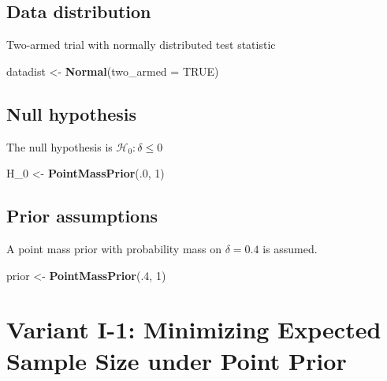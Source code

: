\documentclass[]{book}
\newenvironment{Shaded}{\begin{snugshade}}{\end{snugshade}}
\newcommand{\DataTypeTok}[1]{\textcolor[rgb]{0.13,0.29,0.53}{#1}}
\newcommand{\DecValTok}[1]{\textcolor[rgb]{0.00,0.00,0.81}{#1}}
\newcommand{\KeywordTok}[1]{\textcolor[rgb]{0.13,0.29,0.53}{\textbf{#1}}}
\newcommand{\NormalTok}[1]{#1}
\newcommand{\OtherTok}[1]{\textcolor[rgb]{0.56,0.35,0.01}{#1}}
\newcommand{\StringTok}[1]{\textcolor[rgb]{0.31,0.60,0.02}{#1}}
\begin{document}
\hypertarget{data-distribution}{%
\subsection{Data distribution}\label{data-distribution}}

Two-armed trial with normally distributed test statistic

\begin{Shaded}
\begin{Highlighting}[]
\NormalTok{datadist <-}\StringTok{ }\KeywordTok{Normal}\NormalTok{(}\DataTypeTok{two_armed =} \OtherTok{TRUE}\NormalTok{)}
\end{Highlighting}
\end{Shaded}

\hypertarget{null-hypothesis}{%
\subsection{Null hypothesis}\label{null-hypothesis}}

The null hypothesis is \(\mathcal{H}_0:\delta \leq 0\)

\begin{Shaded}
\begin{Highlighting}[]
\NormalTok{H_}\DecValTok{0}\NormalTok{ <-}\StringTok{ }\KeywordTok{PointMassPrior}\NormalTok{(.}\DecValTok{0}\NormalTok{, }\DecValTok{1}\NormalTok{)}
\end{Highlighting}
\end{Shaded}

\hypertarget{prior-assumptions}{%
\subsection{Prior assumptions}\label{prior-assumptions}}

A point mass prior with probability mass on \(\delta = 0.4\) is assumed.

\begin{Shaded}
\begin{Highlighting}[]
\NormalTok{prior <-}\StringTok{ }\KeywordTok{PointMassPrior}\NormalTok{(.}\DecValTok{4}\NormalTok{, }\DecValTok{1}\NormalTok{)}
\end{Highlighting}
\end{Shaded}

\hypertarget{variantI_1}{%
\section{Variant I-1: Minimizing Expected Sample Size under Point Prior}\label{variantI_1}}
\end{document}
